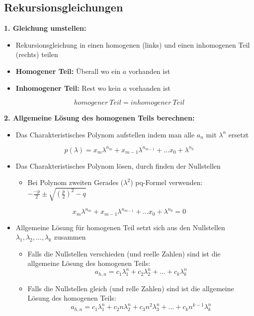 \subsection{Rekursionsgleichungen}

\textbf{1. Gleichung umstellen:}

\begin{itemize}
\item Rekursionsgleichung in einen homogenen (links) und einen inhomogenen Teil  (rechts) teilen
\item \textbf{Homogener Teil:} Überall wo ein $a$ vorhanden ist
\item \textbf{Inhomogener Teil:} Rest wo kein $a$ vorhanden ist
\end{itemize}
$$
homogener \ Teil = inhomogener \ Teil
$$

\textbf{2. Allgemeine Lösung des homogenen Teils berechnen:}

\begin{itemize}
\item Das Charakteristisches Polynom aufstellen indem man alle $a_n$ mit $\lambda ^n$ ersetzt
\end{itemize}
$$
p(\lambda ) = x_m \lambda ^{n_m} + x_{m-1} \lambda ^{n_{m-1}} + \dots x_0 + \lambda ^{n_0}
$$

\begin{itemize}
\item Das Charakteristisches Polynom lösen, durch finden der Nullstellen 
\begin{itemize}
\item Bei Polynom zweiten Gerades ($\lambda ^2$) pq-Formel verwenden: $-\frac{-p}{2} \pm \sqrt{(\frac{p}{2})^2 - q}$
\end{itemize}
\end{itemize}
$$
x_m \lambda ^{n_m} + x_{m-1} \lambda ^{n_{m-1}} + \dots x_0 + \lambda ^{n_0} = 0
$$

\begin{itemize}
\item Allgemeine Lösung für homogenen Teil setzt sich aus den Nullstellen $\lambda _1, \lambda _2, \dots , \lambda _k$ zusammen
\begin{itemize}
\item Falls die Nullstellen verschieden (und reelle Zahlen) sind ist die allgemeine Lösung des homogenen Teils: $$a_{h,n} = c_1 \lambda _1 ^n + c_{2} \lambda _2 ^n + \dots + c_k \lambda _k ^n$$
\item Falls die Nullstellen gleich (und relle Zahlen) sind ist die allgemeine Lösung des homogenen Teils: $$a_{h,n} = c_1 \lambda _1 ^n + c_{2} n \lambda _2 ^n + c_{3} n^2 \lambda _3 ^n + \dots + c_k n^{k-1} \lambda _k ^n$$
\end{itemize}
\end{itemize}

